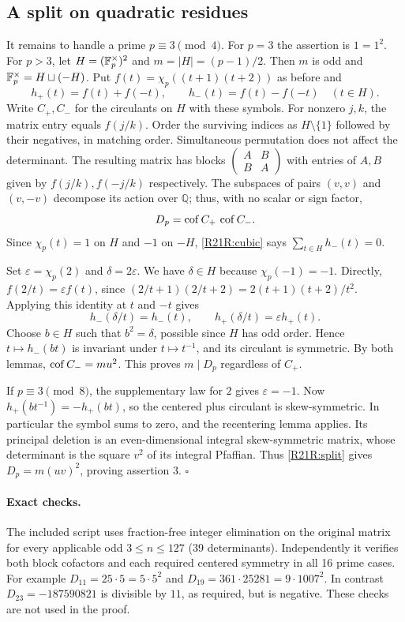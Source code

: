 \documentclass[11pt,a4paper]{article}
\begin{document}
\subsection{A split on quadratic residues}
It remains to handle a prime $p\equiv3\pmod4$. For $p=3$ the assertion is $1=1^2$. For $p>3$, let $H=(\mathbb F_p^\times)^2$ and $m=|H|=(p-1)/2$. Then $m$ is odd and $\mathbb F_p^\times=H\sqcup(-H)$. Put $f(t)=\chi_p((t+1)(t+2))$ as before and
\[
 h_+(t)=f(t)+f(-t),\qquad h_-(t)=f(t)-f(-t)\quad(t\in H).
\]
Write $C_+,C_-$ for the circulants on $H$ with these symbols. For nonzero $j,k$, the matrix entry equals $f(j/k)$. Order the surviving indices as $H\setminus\{1\}$ followed by their negatives, in matching order. Simultaneous permutation does not affect the determinant. The resulting matrix has blocks $\left(\begin{smallmatrix}A&B\\ B&A\end{smallmatrix}\right)$ with entries of $A,B$ given by $f(j/k), f(-j/k)$ respectively. The subspaces of pairs $(v,v)$ and $(v,-v)$ decompose its action over $\mathbb Q$; thus, with no scalar or sign factor,
\begin{equation}
 D_p=\operatorname{cof} C_+\, \operatorname{cof} C_- . \label{R21R:split}
\end{equation}
Since $\chi_p(t)=1$ on $H$ and $-1$ on $-H$, \eqref{R21R:cubic} says $\sum_{t\in H} h_-(t)=0$.

Set $\varepsilon=\chi_p(2)$ and $\delta=2\varepsilon$. We have $\delta\in H$ because $\chi_p(-1)=-1$. Directly, $f(2/t)=\varepsilon f(t)$, since $(2/t+1)(2/t+2)=2(t+1)(t+2)/t^2$. Applying this identity at $t$ and $-t$ gives
\[
 h_-(\delta/t)=h_-(t), \qquad h_+(\delta/t)=\varepsilon h_+(t).
\]
Choose $b\in H$ such that $b^2=\delta$, possible since $H$ has odd order. Hence $t\mapsto h_-(bt)$ is invariant under $t\mapsto t^{-1}$, and its circulant is symmetric. By both lemmas, $\operatorname{cof} C_-=m u^2$. This proves $m\mid D_p$ regardless of $C_+$.

If $p\equiv3\pmod8$, the supplementary law for $2$ gives $\varepsilon=-1$. Now $h_+(bt^{-1})=-h_+(bt)$, so the centered plus circulant is skew-symmetric. In particular the symbol sums to zero, and the recentering lemma applies. Its principal deletion is an even-dimensional integral skew-symmetric matrix, whose determinant is the square $v^2$ of its integral Pfaffian. Thus \eqref{R21R:split} gives $D_p=m(uv)^2$, proving assertion 3. \hfill $\square$

\paragraph{Exact checks.}
The included script uses fraction-free integer elimination on the original matrix for every applicable odd $3\le n\le127$ (39 determinants). Independently it verifies both block cofactors and each required centered symmetry in all 16 prime cases. For example $D_{11}=25\cdot5=5\cdot5^2$ and $D_{19}=361\cdot25281=9\cdot1007^2$. In contrast $D_{23}=-187590821$ is divisible by $11$, as required, but is negative. These checks are not used in the proof.
\endgroup
\end{document}
